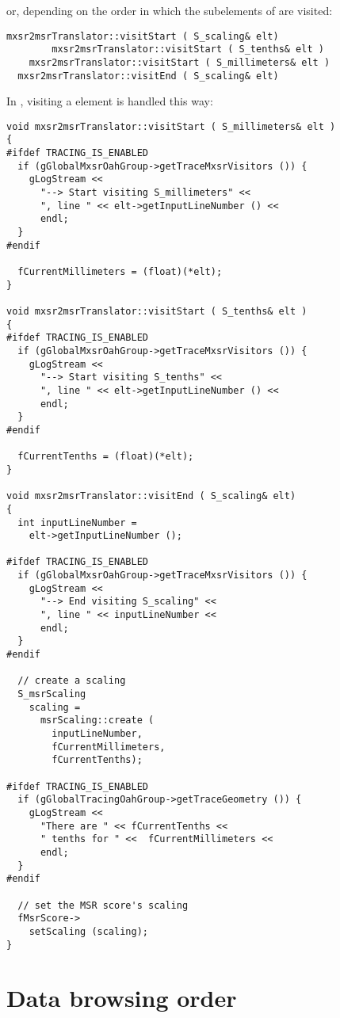 or, depending on the order in which the subelements of  are visited:
\begin{lstlisting}[language=CPlusPlus]
  mxsr2msrTranslator::visitStart ( S_scaling& elt)
		mxsr2msrTranslator::visitStart ( S_tenths& elt )
  	mxsr2msrTranslator::visitStart ( S_millimeters& elt )
  mxsr2msrTranslator::visitEnd ( S_scaling& elt)
\end{lstlisting}

In , visiting a  element is handled this way:
\begin{lstlisting}[language=CPlusPlus,caption={Visiting \musicXmlMarkup{scaling}}]
void mxsr2msrTranslator::visitStart ( S_millimeters& elt )
{
#ifdef TRACING_IS_ENABLED
  if (gGlobalMxsrOahGroup->getTraceMxsrVisitors ()) {
    gLogStream <<
      "--> Start visiting S_millimeters" <<
      ", line " << elt->getInputLineNumber () <<
      endl;
  }
#endif

  fCurrentMillimeters = (float)(*elt);
}

void mxsr2msrTranslator::visitStart ( S_tenths& elt )
{
#ifdef TRACING_IS_ENABLED
  if (gGlobalMxsrOahGroup->getTraceMxsrVisitors ()) {
    gLogStream <<
      "--> Start visiting S_tenths" <<
      ", line " << elt->getInputLineNumber () <<
      endl;
  }
#endif

  fCurrentTenths = (float)(*elt);
}

void mxsr2msrTranslator::visitEnd ( S_scaling& elt)
{
  int inputLineNumber =
    elt->getInputLineNumber ();

#ifdef TRACING_IS_ENABLED
  if (gGlobalMxsrOahGroup->getTraceMxsrVisitors ()) {
    gLogStream <<
      "--> End visiting S_scaling" <<
      ", line " << inputLineNumber <<
      endl;
  }
#endif

  // create a scaling
  S_msrScaling
    scaling =
      msrScaling::create (
        inputLineNumber,
        fCurrentMillimeters,
        fCurrentTenths);

#ifdef TRACING_IS_ENABLED
  if (gGlobalTracingOahGroup->getTraceGeometry ()) {
    gLogStream <<
      "There are " << fCurrentTenths <<
      " tenths for " <<  fCurrentMillimeters <<
      endl;
  }
#endif

  // set the MSR score's scaling
  fMsrScore->
    setScaling (scaling);
}
\end{lstlisting}


\section{Data browsing order}

